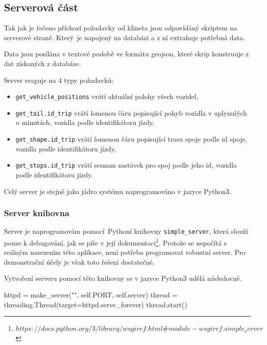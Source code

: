 \subsection{Serverová část}

Tak jak je řečeno příchozí požadavky od klineta jsou odpovídáný skriptem na serverové straně. Který je napojený na databázi a z ní extrahuje potřebná data.

\bigbreak

Data jsou posílána v textové podobě ve formátu \gls{geojson}, které skrip konstruuje z dat získaných z databáze.

\bigbreak

Server reaguje na 4 typy požadavků:

\begin{itemize}
	\item \verb-get_vehicle_positions- vrátí aktuální polohy všech vozidel,

	\item \verb-get_tail.id_trip- vrátí lomenou čáru popisující pohyb vozidla v uplynulých $n$ minutách, vozidla podle identifikátoru jízdy,

	\item \verb-get_shape.id_trip- vrátí lomenou čáru popisující trasu spoje podle id spoje, vozidla podle identifikátoru jízdy,

	\item \verb-get_stops.id_trip- vrátí seznam zastávek pro spoj podle jeho id, vozidla podle identifikátoru jízdy.
\end{itemize}

Celý server je stejně jako jádro systému naprogramováno v jazyce Python3.

\subsubsection{Server knihovna}

Server je naprogramovám pomocí Pythoní knihovny \verb-simple_server-, která slouží pouze k debugování, jak se píše v její dokumentaci\footnote{$https://docs.python.org/3/library/wsgiref.html\#module-wsgiref.simple_server$}. Protože se nepočítá s reálným nasezením této aplikace, není potřeba programovat robustní server. Pro demonstrační účely je však toto řešení dostatečné.

\bigbreak

Vytvoření serveru pomocí této knihovny se v jazyce Python3 udělá následovně.

\begin{code}[frame=none]
httpd = make_server("", self.PORT, self.server)
thread = threading.Thread(target=httpd.serve_forever)
thread.start()
\end{code}

